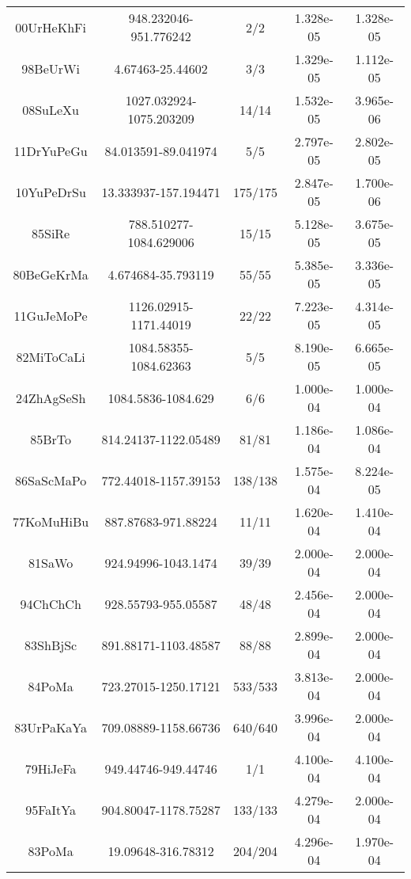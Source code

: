 \begin{longtable}{c c c c c}
00UrHeKhFi \cite{00UrHeKhFi.NH3} & 948.232046-951.776242 & 2/2 & 1.328e-05 & 1.328e-05 \\
98BeUrWi \cite{98BeUrWi.NH3} & 4.67463-25.44602 & 3/3 & 1.329e-05 & 1.112e-05 \\
08SuLeXu \cite{08SuLeXu.NH3} & 1027.032924-1075.203209 & 14/14 & 1.532e-05 & 3.965e-06 \\
11DrYuPeGu \cite{11DrYuPeGu.NH3} & 84.013591-89.041974 & 5/5 & 2.797e-05 & 2.802e-05 \\
10YuPeDrSu \cite{10YuPeDrSu.NH3} & 13.333937-157.194471 & 175/175 & 2.847e-05 & 1.700e-06 \\
85SiRe \cite{85SiRe.NH3} & 788.510277-1084.629006 & 15/15 & 5.128e-05 & 3.675e-05 \\
80BeGeKrMa \cite{80BeGeKrMa.NH3} & 4.674684-35.793119 & 55/55 & 5.385e-05 & 3.336e-05 \\
11GuJeMoPe \cite{11GuJeMoPe.NH3} & 1126.02915-1171.44019 & 22/22 & 7.223e-05 & 4.314e-05 \\
82MiToCaLi \cite{82MiToCaLi.NH3} & 1084.58355-1084.62363 & 5/5 & 8.190e-05 & 6.665e-05 \\
24ZhAgSeSh \cite{24ZhAgSeSh.NH3} & 1084.5836-1084.629 & 6/6 & 1.000e-04 & 1.000e-04 \\
85BrTo \cite{85BrTo.NH3} & 814.24137-1122.05489 & 81/81 & 1.186e-04 & 1.086e-04 \\
86SaScMaPo \cite{86SaScMaPo.NH3} & 772.44018-1157.39153 & 138/138 & 1.575e-04 & 8.224e-05 \\
77KoMuHiBu \cite{77KoMuHiBu.NH3} & 887.87683-971.88224 & 11/11 & 1.620e-04 & 1.410e-04 \\
81SaWo \cite{81SaWo.NH3} & 924.94996-1043.1474 & 39/39 & 2.000e-04 & 2.000e-04 \\
94ChChCh \cite{94ChChCh.NH3} & 928.55793-955.05587 & 48/48 & 2.456e-04 & 2.000e-04 \\
83ShBjSc \cite{83ShBjSc.NH3} & 891.88171-1103.48587 & 88/88 & 2.899e-04 & 2.000e-04 \\
84PoMa \cite{84PoMa.NH3} & 723.27015-1250.17121 & 533/533 & 3.813e-04 & 2.000e-04 \\
83UrPaKaYa \cite{83UrPaKaYa.NH3} & 709.08889-1158.66736 & 640/640 & 3.996e-04 & 2.000e-04 \\
79HiJeFa \cite{79HiJeFa.NH3} & 949.44746-949.44746 & 1/1 & 4.100e-04 & 4.100e-04 \\
95FaItYa \cite{95FaItYa.NH3} & 904.80047-1178.75287 & 133/133 & 4.279e-04 & 2.000e-04 \\
83PoMa \cite{83PoMa.NH3} & 19.09648-316.78312 & 204/204 & 4.296e-04 & 1.970e-04 \\

\end{longtable}
